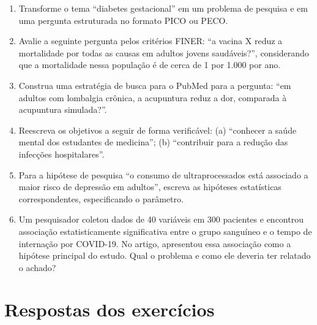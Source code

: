 \documentclass[
]{book}
\begin{document}
\begin{enumerate}
\def\labelenumi{\arabic{enumi}.}
\item
  Transforme o tema ``diabetes gestacional'' em um problema de pesquisa e em uma pergunta estruturada no formato PICO ou PECO.
\item
  Avalie a seguinte pergunta pelos critérios FINER: ``a vacina X reduz a mortalidade por todas as causas em adultos jovens saudáveis?'', considerando que a mortalidade nessa população é de cerca de 1 por 1.000 por ano.
\item
  Construa uma estratégia de busca para o PubMed para a pergunta: ``em adultos com lombalgia crônica, a acupuntura reduz a dor, comparada à acupuntura simulada?''.
\item
  Reescreva os objetivos a seguir de forma verificável: (a) ``conhecer a saúde mental dos estudantes de medicina''; (b) ``contribuir para a redução das infecções hospitalares''.
\item
  Para a hipótese de pesquisa ``o consumo de ultraprocessados está associado a maior risco de depressão em adultos'', escreva as hipóteses estatísticas correspondentes, especificando o parâmetro.
\item
  Um pesquisador coletou dados de 40 variáveis em 300 pacientes e encontrou associação estatisticamente significativa entre o grupo sanguíneo e o tempo de internação por COVID-19. No artigo, apresentou essa associação como a hipótese principal do estudo. Qual o problema e como ele deveria ter relatado o achado?
\end{enumerate}

\section{Respostas dos exercícios}\label{respostas-dos-exercuxedcios-1}
\end{document}
